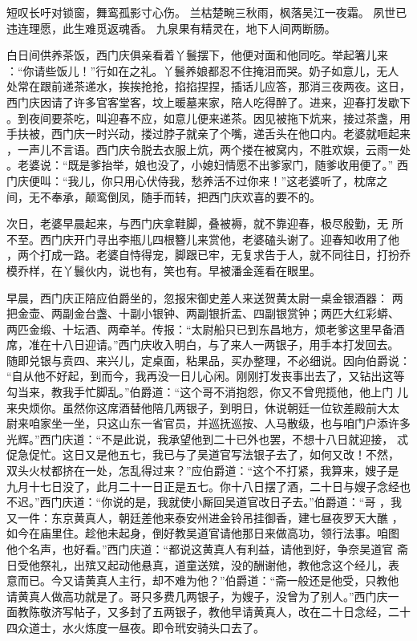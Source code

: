 短叹长吁对锁窗，舞鸾孤影寸心伤。
兰枯楚畹三秋雨，枫落吴江一夜霜。
夙世已违连理愿，此生难觅返魂香。
九泉果有精灵在，地下人间两断肠。

白日间供养茶饭，西门庆俱亲看着丫鬟摆下，他便对面和他同吃。举起箸儿来
：“你请些饭儿！”行如在之礼。丫鬟养娘都忍不住掩泪而哭。奶子如意儿，无人
处常在跟前递茶递水，挨挨抢抢，掐掐捏捏，插话儿应答，那消三夜两夜。这日，
西门庆因请了许多官客堂客，坟上暖墓来家，陪人吃得醉了。进来，迎春打发歇下
。到夜间要茶吃，叫迎春不应，如意儿便来递茶。因见被拖下炕来，接过茶盏，用
手扶被，西门庆一时兴动，搂过脖子就亲了个嘴，递舌头在他口内。老婆就咂起来
，一声儿不言语。西门庆令脱去衣服上炕，两个搂在被窝内，不胜欢娱，云雨一处
。老婆说：“既是爹抬举，娘也没了，小媳妇情愿不出爹家门，随爹收用便了。”
西门庆便叫：“我儿，你只用心伏侍我，愁养活不过你来！”这老婆听了，枕席之
间，无不奉承，颠鸾倒凤，随手而转，把西门庆欢喜的要不的。

次日，老婆早晨起来，与西门庆拿鞋脚，叠被褥，就不靠迎春，极尽殷勤，无
所不至。西门庆开门寻出李瓶儿四根簪儿来赏他，老婆磕头谢了。迎春知收用了他
，两个打成一路。老婆自恃得宠，脚跟已牢，无复求告于人，就不同往日，打扮乔
模乔样，在丫鬟伙内，说也有，笑也有。早被潘金莲看在眼里。

早晨，西门庆正陪应伯爵坐的，忽报宋御史差人来送贺黄太尉一桌金银酒器：
两把金壶、两副金台盏、十副小银钟、两副银折盂、四副银赏钟；两匹大红彩蟒、
两匹金缎、十坛酒、两牵羊。传报：“太尉船只已到东昌地方，烦老爹这里早备酒
席，准在十八日迎请。”西门庆收入明白，与了来人一两银子，用手本打发回去。
随即兑银与贲四、来兴儿，定桌面，粘果品，买办整理，不必细说。因向伯爵说：
“自从他不好起，到而今，我再没一日儿心闲。刚刚打发丧事出去了，又钻出这等
勾当来，教我手忙脚乱。”伯爵道：“这个哥不消抱怨，你又不曾兜揽他，他上门
儿来央烦你。虽然你这席酒替他陪几两银子，到明日，休说朝廷一位钦差殿前大太
尉来咱家坐一坐，只这山东一省官员，并巡抚巡按、人马散级，也与咱门户添许多
光辉。”西门庆道：“不是此说，我承望他到二十已外也罢，不想十八日就迎接，
忒促急促忙。这日又是他五七，我已与了吴道官写法银子去了，如何又改！不然，
双头火杖都挤在一处，怎乱得过来？”应伯爵道：“这个不打紧，我算来，嫂子是
九月十七日没了，此月二十一日正是五七。你十八日摆了酒，二十日与嫂子念经也
不迟。”西门庆道：“你说的是，我就使小厮回吴道官改日子去。”伯爵道：“哥
，我又一件：东京黄真人，朝廷差他来泰安州进金铃吊挂御香，建七昼夜罗天大醮
，如今在庙里住。趁他未起身，倒好教吴道官请他那日来做高功，领行法事。咱图
他个名声，也好看。”西门庆道：“都说这黄真人有利益，请他到好，争奈吴道官
斋日受他祭礼，出殡又起动他悬真，道童送殡，没的酬谢他，教他念这个经儿，表
意而已。今又请黄真人主行，却不难为他？”伯爵道：“斋一般还是他受，只教他
请黄真人做高功就是了。哥只多费几两银子，为嫂子，没曾为了别人。”西门庆一
面教陈敬济写帖子，又多封了五两银子，教他早请黄真人，改在二十日念经，二十
四众道士，水火炼度一昼夜。即令玳安骑头口去了。


